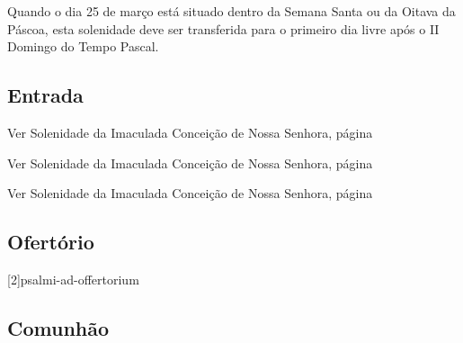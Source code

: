 
\begin{rubrica}
  Quando o dia 25 de março está situado dentro da Semana Santa ou da Oitava da Páscoa, esta solenidade deve ser transferida para o primeiro dia livre após o II Domingo do Tempo Pascal.
\end{rubrica}

\subsection{Entrada}\label{subsection:proprium-sanctorum/in-annuntiatione-domini/introitus}

\begin{rubrica}
  Ver Solenidade da Imaculada Conceição de Nossa Senhora, página~\pageref{subsection:proprium-sanctorum/in-conceptione-immaculata-bmv/psalmus-responsorius}
\end{rubrica}

\begin{rubrica}
  Ver Solenidade da Imaculada Conceição de Nossa Senhora, página~\pageref{subsection:proprium-sanctorum/in-conceptione-immaculata-bmv/alleluia}
\end{rubrica}

\begin{rubrica}
  Ver Solenidade da Imaculada Conceição de Nossa Senhora, página~\pageref{subsection:proprium-sanctorum/in-conceptione-immaculata-bmv/psalmus-alleluiaticus}
\end{rubrica}

\AllowPageFlush

\subsection{Ofertório}\label{subsection:proprium-sanctorum/in-annuntiatione-domini/offertorium}
[2]{psalmi-ad-offertorium}

\AllowPageBreak

\subsection{Comunhão}\label{subsection:proprium-sanctorum/in-annuntiatione-domini/communio}

\AllowPageFlush